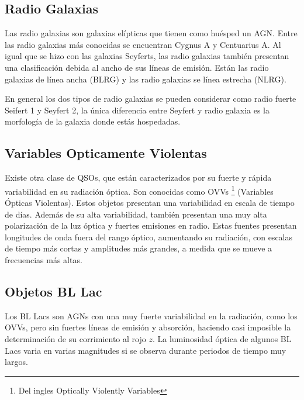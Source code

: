 	\subsection{Radio Galaxias}
	\label{subsec:Radio_Galaxy}

Las radio galaxias son galaxias elípticas que tienen como huésped un AGN. Entre las radio galaxias más conocidas se encuentran Cygnus A y Centuarius A. Al igual que se hizo con las galaxias Seyferts, las radio galaxias también presentan una clasificación debida al ancho de sus  líneas de emisión. Están las radio galaxias de línea ancha (BLRG) y las radio galaxias se línea estrecha (NLRG).

En general los dos tipos de radio galaxias se pueden considerar como radio fuerte Seifert 1 y Seyfert 2, la única diferencia entre Seyfert y radio galaxia es la morfología de la galaxia donde estás hospedadas. 

	\subsection{Variables Opticamente Violentas}
	\label{subsec:Optically_Violently_Variables}

Existe otra clase de QSOs, que están caracterizados por su fuerte y rápida variabilidad en su radiación óptica. Son conocidas como OVVs \footnote{Del ingles Optically Violently Variables } (Variables Ópticas Violentas). Estos objetos presentan una variabilidad en escala de tiempo de días. Además de su alta variabilidad, también presentan una muy alta polarización de la luz óptica y fuertes emisiones en radio. Estas fuentes presentan longitudes de onda fuera del rango óptico, aumentando su radiación, con escalas de tiempo más cortas y amplitudes más grandes, a medida que se mueve a frecuencias más altas.  

	\subsection{Objetos BL Lac}
	\label{subsec:BL_Lac}

Los BL Lacs son AGNs con una muy fuerte variabilidad en la radiación, como los OVVs, pero sin fuertes líneas de emisión y absorción, haciendo casi imposible la determinación de su corrimiento al rojo $z$. La luminosidad óptica de algunos BL Lacs varia en varias magnitudes si se observa durante periodos de tiempo muy largos.

